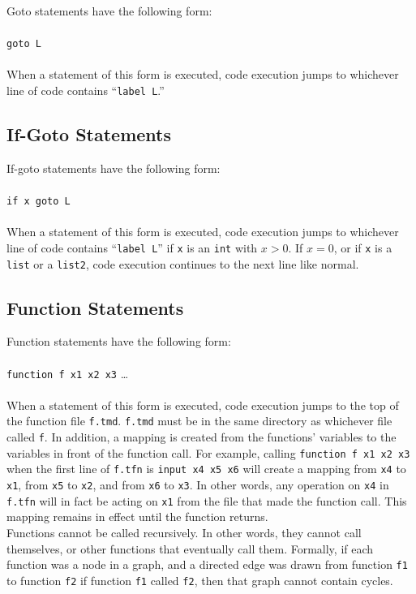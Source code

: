 Goto statements have the following form: \\ \\
\texttt{goto L} \\ \\ 
When a statement of this form is executed, code execution jumps to whichever line of code contains ``\texttt{label L}.''

\subsection{If-Goto Statements}

If-goto statements have the following form: \\ \\
\texttt{if x goto L} \\ \\ 
When a statement of this form is executed, code execution jumps to whichever line of code contains ``\texttt{label L}'' if \texttt{x} is an \texttt{int} with $x > 0$. If $x = 0$, or if \texttt{x} is a \texttt{list} or a \texttt{list2}, code execution continues to the next line like normal. \\

\subsection{Function Statements \label{sec:funcstatements}}

Function statements have the following form: \\ \\
\texttt{function f x1 x2 x3} \dots \\ \\ 
When a statement of this form is executed, code execution jumps to the top of the function file \texttt{f.tmd}. \texttt{f.tmd} must be in the same directory as whichever file called \texttt{f}. In addition, a mapping is created from the functions' variables to the variables in front of the function call. For example, calling \texttt{function f x1 x2 x3} when the first line of \texttt{f.tfn} is \texttt{input x4 x5 x6} will create a mapping from \texttt{x4} to \texttt{x1}, from \texttt{x5} to \texttt{x2}, and from \texttt{x6} to \texttt{x3}. In other words, any operation on \texttt{x4} in \texttt{f.tfn} will in fact be acting on \texttt{x1} from the file that made the function call. This mapping remains in effect until the function returns. \\

Functions cannot be called recursively. In other words, they cannot call themselves, or other functions that eventually call them. Formally, if each function was a node in a graph, and a directed edge was drawn from function \texttt{f1} to function \texttt{f2} if function \texttt{f1} called \texttt{f2}, then that graph cannot contain cycles.

